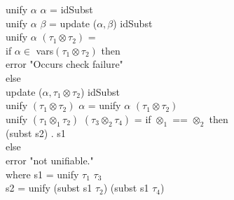 \documentclass[11pt]{article}
\begin{document}
\begin{smallprogram*}
\> unify $\alpha$ $\alpha$ = idSubst \\
\> unify $\alpha$ $\beta$ = update ($\alpha, \beta$) idSubst \\
\> unify $\alpha$ $(\tau_1\otimes\tau_2)$ = \\
\>             if $\alpha\in$ vars$(\tau_1\otimes\tau_2)$ then\\
\>                error "Occurs check failure"\\
\>             else\\
\>                update ($\alpha, \tau_1\otimes\tau_2$) idSubst \\
\> unify $(\tau_1\otimes\tau_2)$ $\alpha$ = unify $\alpha$ $(\tau_1\otimes\tau_2)$ \\
\> unify $(\tau_1\otimes_1\tau_2)$ $(\tau_3\otimes_2\tau_4)$ = if $\otimes_1$ == $\otimes_2$ then\\
\>                                       (subst s2) . s1 \\
\>                                     else \\
\>                                       error "not unifiable." \\
\>               where s1 = unify $\tau_1$ $\tau_3$  \\
\>                       s2 = unify (subst s1 $\tau_2$) (subst s1 $\tau_4$) \\
\end{smallprogram*}

\end{document}
